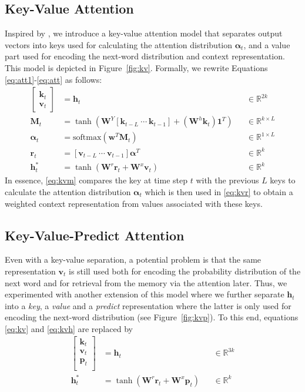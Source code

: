 \documentclass{article}
\newcommand{\vect}[1]{\ensuremath{\bm{#1}}}
\newcommand{\mat}[1]{\ensuremath{\bm{#1}}}
\begin{document}
\subsection{Key-Value Attention}
\label{sec:kv}
Inspired by \cite{MIL16, ba2016using, reed2015neural, gulcehre2016dynamic}, we introduce a key-value attention model that separates output vectors into keys used for calculating the attention distribution $\vect{\alpha}_t$, and a value part used for encoding the next-word distribution and context representation.
This model is depicted in Figure~\ref{fig:kv}.
Formally, we rewrite Equations \ref{eq:att1}-\ref{eq:att} as follows:
\begin{align}
\begin{bmatrix}
	\vect{k}_t \\
	\vect{v}_t
\end{bmatrix} &= \vect{h}_t && \in\mathbb{R}^{2k} \label{eq:kv}\\
    \mat{M}_t &= \tanh(\mat{W}^Y [\vect{k}_{t-L}\ \cdots\ \vect{k}_{t-1}] + (\mat{W}^h\vect{k}_t)\vect{1}^T) && \in \mathbb{R}^{k\times L} \label{eq:kvm}\\
    \vect{\alpha}_t &= \text{softmax}(\vect{w}^T \mat{M}_t) && \in \mathbb{R}^{1 \times L} \\
    \vect{r}_t  &= [\vect{v}_{t-L}\ \cdots\ \vect{v}_{t-1}]\vect{\alpha}^T && \in \mathbb{R}^{k} \label{eq:kvr}\\
    \vect{h}_t^* &= \tanh(\mat{W}^r \vect{r}_t + \mat{W}^x\vect{v}_t) &&\in \mathbb{R}^{k} \label{eq:kvh}
\end{align}
In essence, \autoref{eq:kvm} compares the key at time step $t$ with the previous $L$ keys to calculate the attention distribution $\vect{\alpha}_t$ which is then used in \autoref{eq:kvr} to obtain a weighted context representation from values associated with these keys.




\subsection{Key-Value-Predict Attention}
\label{sec:kvp}
Even with a key-value separation, a potential problem is that the same representation $\vect{v}_t$ is still used both for encoding the probability distribution of the next word and for retrieval from the memory via the attention later.
Thus, we experimented with another extension of this model where we further separate $\vect{h}_t$ into a \emph{key}, a \emph{value} and a \emph{predict} representation where the latter is only used for encoding the next-word distribution (see Figure~\autoref{fig:kvp}).
To this end, equations \ref{eq:kv} and \ref{eq:kvh} are replaced by
\begin{align}
\begin{bmatrix}
		\vect{k}_t \\
		\vect{v}_t \\
		\vect{p}_t \\		
\end{bmatrix} &= \vect{h}_t && \in\mathbb{R}^{3k}\\
    \vect{h}_t^* &= \tanh(\mat{W}^r \vect{r}_t + \mat{W}^x\vect{p}_t) &&\in \mathbb{R}^{k}
\end{align}
\end{document}
